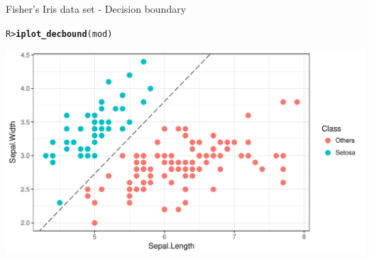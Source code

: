\documentclass{beamer}\usepackage[]{graphicx}\usepackage[]{color}
\makeatletter
\def\maxwidth{ %
  \ifdim\Gin@nat@width>\linewidth
    \linewidth
  \else
    \Gin@nat@width
  \fi
}
\newcommand{\hlstd}[1]{\textcolor[rgb]{0.345,0.345,0.345}{#1}}%
\newcommand{\hlkwd}[1]{\textcolor[rgb]{0.737,0.353,0.396}{\textbf{#1}}}%
\newenvironment{kframe}{%
 \def\at@end@of@kframe{}%
 \ifinner\ifhmode%
  \def\at@end@of@kframe{\end{minipage}}%
  \begin{minipage}{\columnwidth}%
 \fi\fi%
 \def\FrameCommand##1{\hskip\@totalleftmargin \hskip-\fboxsep
 \colorbox{shadecolor}{##1}\hskip-\fboxsep
     \hskip-\linewidth \hskip-\@totalleftmargin \hskip\columnwidth}%
 \MakeFramed {\advance\hsize-\width
   \@totalleftmargin\z@ \linewidth\hsize
   \@setminipage}}%
 {\par\unskip\endMakeFramed%
 \at@end@of@kframe}
\newenvironment{knitrout}{}{} %
\makeatother
\begin{document}
\begin{frame}[fragile]{Fisher's Iris data set - Decision boundary}
\vspace{-5pt}
\begin{knitrout}\small
{}\color{fgcolor}\begin{kframe}
\begin{alltt}
\hlstd{R> }\hlkwd{iplot_decbound}\hlstd{(mod)}
\end{alltt}
\end{kframe}

{\centering \includegraphics[width=\maxwidth]{figure/iris-decbound-1} 

}



\end{knitrout}
\end{frame}
\end{document}
